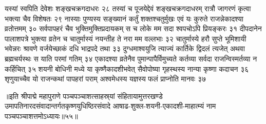 यस्यां स्वपिति देवेशः शङ्खचक्रगदाधरः २८
तस्यां च पूजयेद्देवं शङ्खचक्रगदाधरम् 
रात्रौ जागरणं कृत्वा भक्त्या चैव विशेषतः २९
नास्याः पुण्यस्य सङ्ख्यानं कर्तुं शक्तश्चतुर्मुखः 
एवं यः कुरुते राजन्नेकादश्या व्रतोत्तमम् ३०
सर्वपापहरं चैव भुक्तिमुक्तिप्रदायकम् 
स च लोके मम सदा श्वपचोऽपि प्रियङ्करः ३१
दीपदानेन पालाशपत्रे भुक्त्या व्रतेन च 
चातुर्मास्यं नयन्तीह ते नरा मम वल्लभाः ३२
चातुर्मास्ये हरौ सुप्ते भूमिशायी भवेन्नरः 
श्रावणे वर्जयेच्छाकं  दधि भाद्रपदे तथा ३३
दुग्धमाश्वयुजि त्याज्यं कार्तिके द्विदलं त्यजेत् 
अथवा ब्रह्मचर्यस्थः स याति परमां गतिम् ३४
एकादश्या व्रतेनैव पुमान्पापैर्विमुच्यते 
कर्तव्या सर्वदा राजन्विस्मर्तव्या न कर्हिचित् ३५
शयनी बोधिनी मध्ये या कृष्णैकादशीभवेत् 
सैवोपोष्या गृहस्थस्य नान्या कृष्णा कदाचन ३६
शृणुयाच्चैव यो राजन्कथां पापहरां पराम् 
अश्वमेधस्य यज्ञस्य फलं प्राप्नोति मानवः ३७

॥इति श्रीपाद्मे महापुराणे पञ्चपञ्चाशत्साहस्र्यां संहितायामुत्तरखण्डे उमापतिनारदसंवादान्तर्गतकृष्णयुधिष्ठिरसंवादे आषाढ-शुक्ल-शयनी-एकादशी-माहात्म्यं नाम पञ्चपञ्चाशत्तमोऽध्यायः॥५५॥




